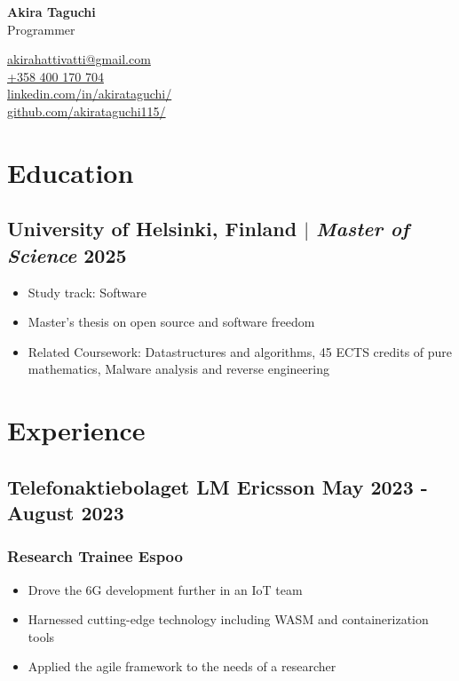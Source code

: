 \documentclass[11pt]{article} %
\begin{document}
\begin{center}
	\begin{minipage}{0.5\textwidth}
		{\Huge\bfseries
			Akira Taguchi %
		} \\ \medskip
		Programmer %
	\end{minipage} \hfill
	\begin{minipage}{0.4\textwidth}
		\raggedleft
		\href{mailto:akirahattivatti@gmail.com}{akirahattivatti@gmail.com} \\
		\href{tel:+358400170704}{+358 400 170 704} \\
		\href{https://www.linkedin.com/in/akirataguchi/}{linkedin.com/in/akirataguchi/} \\
		\href{https://github.com/akirataguchi115/}{github.com/akirataguchi115/}
	\end{minipage}
\end{center}

\section{Education}
\subsection{University of Helsinki, Finland $|$ {\normalfont\itshape Master of Science} \hfill 2025}
\begin{itemize}
	\item Study track: Software
	\item Master's thesis on open source and software freedom
  \item Related Coursework: Datastructures and algorithms, 45 ECTS credits of pure mathematics, Malware analysis and reverse engineering
\end{itemize}

\section{Experience}
\subsection{Telefonaktiebolaget LM Ericsson \hfill May 2023 - August 2023}
\subsubsection{Research Trainee \hfill  Espoo}
\begin{itemize}
  \item Drove the 6G development further in an IoT team
  \item Harnessed cutting-edge technology including WASM and containerization tools
	\item Applied the agile framework to the needs of a researcher
\end{itemize}
\end{document}
